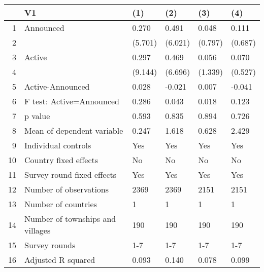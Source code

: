 \begin{table}[ht]
\centering
\begin{tabular}{rlllll}
  \hline
 & V1 & (1) & (2) & (3) & (4) \\ 
  \hline
1 & Announced & 0.270 & 0.491 & 0.048 & 0.111 \\ 
  2 &  & (5.701) & (6.021) & (0.797) & (0.687) \\ 
  3 & Active & 0.297 & 0.469 & 0.056 & 0.070 \\ 
  4 &  & (9.144) & (6.696) & (1.339) & (0.527) \\ 
  5 & Active-Announced & 0.028 & -0.021 & 0.007 & -0.041 \\ 
  6 & F test: Active=Announced & 0.286 & 0.043 & 0.018 & 0.123 \\ 
  7 & p value & 0.593 & 0.835 & 0.894 & 0.726 \\ 
  8 & Mean of dependent variable & 0.247 & 1.618 & 0.628 & 2.429 \\ 
  9 & Individual controls & Yes & Yes & Yes & Yes \\ 
  10 & Country fixed effects & No & No & No & No \\ 
  11 & Survey round fixed effects & Yes & Yes & Yes & Yes \\ 
  12 & Number of observations & 2369 & 2369 & 2151 & 2151 \\ 
  13 & Number of countries & 1 & 1 & 1 & 1 \\ 
  14 & Number of townships and villages & 190 & 190 & 190 & 190 \\ 
  15 & Survey rounds & 1-7 & 1-7 & 1-7 & 1-7 \\ 
  16 & Adjusted R squared & 0.093 & 0.140 & 0.078 & 0.099 \\ 
   \hline
\end{tabular}
\end{table}
